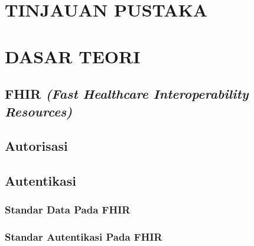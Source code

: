 \documentclass[ugmtesis]{ugmtesis}
\begin{document}


\chapter{TINJAUAN PUSTAKA}
\label{TINJAUAN PUSTAKA}




\chapter{DASAR TEORI}
\label{DASAR TEORI}

	\section{FHIR \textit{(Fast Healthcare Interoperability Resources)}}
	\label{dasar teori fhir}
	

	\section{Autorisasi}
	\label{Autorisasi}
	

	\section{Autentikasi}
	\label{Autentikasi}
	
		\subsection{Standar Data Pada FHIR}
		\label{standar data pada fhir}
		

		\subsection{Standar Autentikasi Pada FHIR}
		\label{standar autentikasi pada fhir}
		
\end{document}
